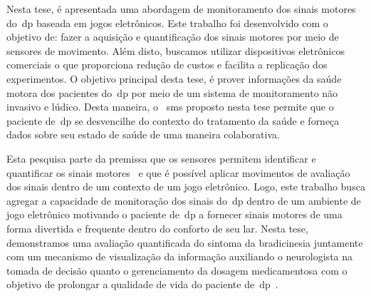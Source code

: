 Nesta tese, é apresentada uma abordagem de monitoramento dos sinais motores do~\ac{dp} baseada em jogos eletrônicos. Este trabalho foi desenvolvido com o objetivo de: fazer a aquisição e quantificação dos sinais motores por meio de sensores de movimento. Além disto, buscamos utilizar dispositivos eletrônicos comerciais o que proporciona redução de custos e facilita a replicação dos experimentos. O objetivo principal desta tese, é prover informações da saúde motora dos pacientes do~\ac{dp} por meio de um sistema de monitoramento não invasivo e lúdico. Desta maneira, o ~\ac{sms} proposto nesta tese permite que o paciente de~\ac{dp} se desvencilhe do contexto do tratamento da saúde e forneça dados sobre seu estado de saúde de uma maneira colaborativa.

Esta pesquisa parte da premissa que os sensores permitem identificar e quantificar os sinais motores~\cite{patel_monitoring_2009,visionbased2009,bachlin_parkinsons_2009} e que é possível aplicar movimentos de avaliação dos sinais dentro de um contexto de um jogo eletrônico. Logo, este trabalho busca agregar a capacidade de monitoração dos sinais do~\ac{dp} dentro de um ambiente de jogo eletrônico motivando o paciente de~\ac{dp} a fornecer sinais motores de uma forma divertida e frequente dentro do conforto de seu lar. Nesta tese, demonstramos uma avaliação quantificada do sintoma da bradicinesia juntamente com um mecanismo de visualização da informação auxiliando o neurologista na tomada de decisão quanto o gerenciamento da dosagem medicamentosa com o objetivo de prolongar a qualidade de vida do paciente de~\ac{dp}~\cite{national2006parkinson}. 





